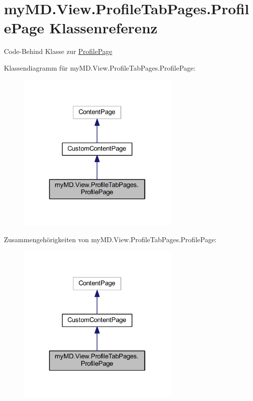 \hypertarget{classmy_m_d_1_1_view_1_1_profile_tab_pages_1_1_profile_page}{}\section{my\+M\+D.\+View.\+Profile\+Tab\+Pages.\+Profile\+Page Klassenreferenz}
\label{classmy_m_d_1_1_view_1_1_profile_tab_pages_1_1_profile_page}


Code-\/\+Behind Klasse zur \mbox{\hyperlink{classmy_m_d_1_1_view_1_1_profile_tab_pages_1_1_profile_page}{Profile\+Page}}  




Klassendiagramm für my\+M\+D.\+View.\+Profile\+Tab\+Pages.\+Profile\+Page\+:
\nopagebreak
\begin{figure}[H]
\begin{center}
\leavevmode
\includegraphics[width=226pt]{classmy_m_d_1_1_view_1_1_profile_tab_pages_1_1_profile_page__inherit__graph}
\end{center}
\end{figure}


Zusammengehörigkeiten von my\+M\+D.\+View.\+Profile\+Tab\+Pages.\+Profile\+Page\+:
\nopagebreak
\begin{figure}[H]
\begin{center}
\leavevmode
\includegraphics[width=226pt]{classmy_m_d_1_1_view_1_1_profile_tab_pages_1_1_profile_page__coll__graph}
\end{center}
\end{figure}
